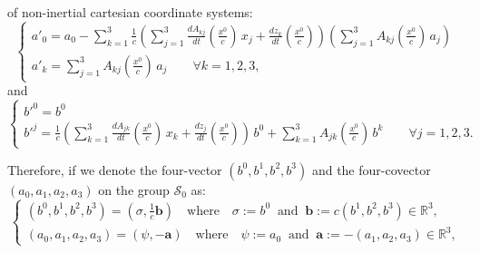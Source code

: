 \documentclass{article}
\theoremstyle{definition}
\theoremstyle{remark}
\renewcommand{\vec}[1]{\mathbf{#1}}
\begin{document}
of non-inertial cartesian coordinate systems:
\begin{equation}\label{fgjfjhgghhgjghjhjijhojpiiihjhjint}
\begin{cases}
a'_0=a_0-\sum_{k=1}^{3}\frac{1}{c}\left(\sum\limits_{j=1}^{3}\frac{dA_{kj}}{dt}\left(\frac{x^0}{c}\right)\,x_j+\frac{d
z_k}{dt}\left(\frac{x^0}{c}\right)\right)\left(\sum_{j=1}^{3}A_{kj}\left(\frac{x^0}{c}\right)\,a_j\right)
\\
a'_k=\sum_{j=1}^{3}A_{kj}\left(\frac{x^0}{c}\right)\,a_j\quad\quad\forall
k=1,2,3,
\end{cases}
\end{equation}
and
\begin{equation}\label{fgjfjhgghhgjgiuouoiuujkjkjkint}
\begin{cases}
b'^0=b^0
\\
b'^j=\frac{1}{c}\left(\sum\limits_{k=1}^{3}\frac{dA_{jk}}{dt}\left(\frac{x^0}{c}\right)\,x_k+\frac{d
z_j}{dt}\left(\frac{x^0}{c}\right)\right)\,b^0+\sum_{k=1}^{3}A_{jk}\left(\frac{x^0}{c}\right)\,b^k\quad\quad\forall
j=1,2,3.
\end{cases}
\end{equation}
%
%
%
\begin{comment}
\begin{equation}\label{fgjfjhgghhgjghjhjijhojihjhjint}
\begin{cases}
a'_0=\frac{\partial f^{(0)}}{\partial
x^0}a_0+\sum_{k=1}^{3}\frac{\partial f^{(k)}}{\partial x^0}a_k
\\
a'_j=\frac{\partial f^{(0)}}{\partial
x^j}a_0+\sum_{k=1}^{3}\frac{\partial f^{(k)}}{\partial
x^j}a_k\quad\quad\forall j=1,2,3,
\end{cases}
\end{equation}
and
\begin{equation}\label{fgjfjhgghhgjgiuouoiuuhjhjint}
\begin{cases}
b'^0=\frac{\partial f^{(0)}}{\partial
x^0}b^0+\sum_{k=1}^{3}\frac{\partial f^{(0)}}{\partial x^k}b^k
\\
b'^j=\frac{\partial f^{(j)}}{\partial
x^0}b^0+\sum_{k=1}^{3}\frac{\partial f^{(j)}}{\partial
x^k}b^k\quad\quad\forall j=1,2,3.
\end{cases}
\end{equation}
\end{comment}
%
%
%
Therefore, if we denote the four-vector $(b^0,b^1,b^2,b^3)$ and the
four-covector $(a_0,a_1,a_2,a_3)$ on the group $\mathcal{S}_0$ as:
\begin{equation}\label{fgjfjhgghhgjghjhjijhojihjhjjijhjjjint}
\begin{cases}
(b^0,b^1,b^2,b^3)=\left(\sigma,\frac{1}{c}\vec
b\right)\quad\text{where}\quad
\sigma:=b^0\;\;\text{and}\;\;\vec b:=c(b^1,b^2,b^3)\in\mathbb{R}^3,\\
(a_0,a_1,a_2,a_3)=(\psi,-\vec a)\quad\text{where}\quad
\psi:=a_0\;\;\text{and}\;\;\vec a:=-(a_1,a_2,a_3)\in\mathbb{R}^3,
\end{cases}
\end{equation}
\end{document}
